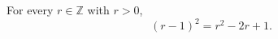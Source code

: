 \documentclass{article}
\begin{document}
\begin{theorem}\label{hold:revision}
For every $r\in\mathbb{Z}$ with $r>0$,
\[(r-1)^2=r^2-2r+1.\]
\end{theorem}
\end{document}
